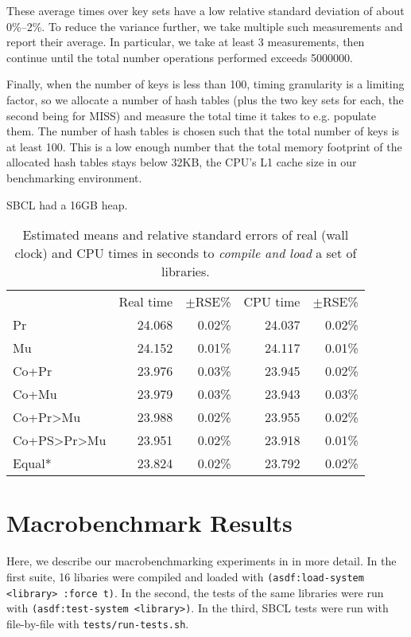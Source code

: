 \documentclass[sigconf]{acmart}
\newcommand*\lisp[1]{\texttt{#1}}
\renewcommand{\label}[1]{%
    \gdef\sfname{sf:##1}}%
\begin{document}
These average times over key sets have a low relative standard deviation of about 0\%--2\%.
To reduce the variance further, we take multiple such measurements and report their average.
In particular, we take at least 3 measurements, then continue until the total number operations performed exceeds \num{5000000}.

Finally, when the number of keys is less than 100, timing granularity is a limiting factor, so we allocate a number of hash tables (plus the two key sets for each, the second being for MISS) and measure the total time it takes to e.g. populate them.
The number of hash tables is chosen such that the total number of keys is at least 100.
This is a low enough number that the total memory footprint of the allocated hash tables stays below 32KB, the CPU's L1 cache size in our benchmarking environment.

SBCL had a 16GB heap.


\begin{table}
  \caption{Estimated means and relative standard errors of real (wall clock) and CPU times in seconds to \emph{compile and load} a set of libraries.}
  \label{tab:load-system-results}
  \centering
  \begin{tabular}{@{}lrrrr@{}}
                   & Real time    & $\pm$RSE\% &     CPU time & $\pm$RSE\% \\
Pr                 & 24.068  &     0.02\% &  24.037 &     0.02\% \\
Mu                 & 24.152  &     0.01\% &  24.117 &     0.01\% \\
Co+Pr              & 23.976  &     0.03\% &  23.945 &     0.02\% \\
Co+Mu              & 23.979  &     0.03\% &  23.943 &     0.03\% \\
Co+Pr>Mu           & 23.988  &     0.02\% &  23.955 &     0.02\% \\
Co+PS>Pr>Mu        & 23.951  &     0.02\% &  23.918 &     0.01\% \\
Equal*             & 23.824  &     0.02\% &  23.792 &     0.02\%
  \end{tabular}
\end{table}

\section{Macrobenchmark Results}
\label{sec:macrobenchmark-results}

Here, we describe our macrobenchmarking experiments in  in more detail.
In the first suite, 16 libaries were compiled and loaded with \lisp{(asdf:load-system <library> :force t)}.
In the second, the tests of the same libraries were run with \lisp{(asdf:test-system <library>)}.
In the third, SBCL tests were run with file-by-file with \texttt{tests/run-tests.sh}.
\end{document}

